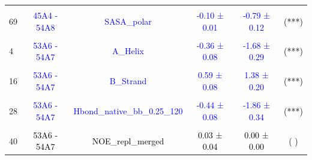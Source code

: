 \documentclass{article}\usepackage[table]{xcolor}
\renewcommand{\$}{$} %
\begin{document}
\begin{center}
\begin{longtable}[t]{lccccc}
\cellcolor{gray!6}{63} & \cellcolor{gray!6}{\textcolor{blue}{45A4 - 54A8}} & \cellcolor{gray!6}{\textcolor{blue}{SASA\_nonpolar}} & \cellcolor{gray!6}{\textcolor{blue}{-0.07 ± 0.01}} & \cellcolor{gray!6}{\textcolor{blue}{-0.50 ± 0.09}} & \cellcolor{gray!6}{\textcolor{black}{(***)}}\\
69 & \textcolor{blue}{45A4 - 54A8} & \textcolor{blue}{SASA\_polar} & \textcolor{blue}{-0.10 ± 0.01} & \textcolor{blue}{-0.79 ± 0.12} & \textcolor{black}{(***)}\\
\cellcolor{gray!6}{75} & \cellcolor{gray!6}{\textcolor{black}{45A4 - 54A8}} & \cellcolor{gray!6}{\textcolor{black}{ThreeTen\_Helix}} & \cellcolor{gray!6}{\textcolor{black}{-0.10 ± 0.08}} & \cellcolor{gray!6}{\textcolor{black}{-0.17 ± 0.11}} & \cellcolor{gray!6}{\textcolor{black}{( )}}\\
4 & \textcolor{blue}{53A6 - 54A7} & \textcolor{blue}{A\_Helix} & \textcolor{blue}{-0.36 ± 0.08} & \textcolor{blue}{-1.68 ± 0.29} & \textcolor{black}{(***)}\\
\cellcolor{gray!6}{10} & \cellcolor{gray!6}{\textcolor{black}{53A6 - 54A7}} & \cellcolor{gray!6}{\textcolor{black}{B\_Bridge}} & \cellcolor{gray!6}{\textcolor{black}{0.07 ± 0.06}} & \cellcolor{gray!6}{\textcolor{black}{0.01 ± 0.08}} & \cellcolor{gray!6}{\textcolor{black}{( )}}\\
16 & \textcolor{blue}{53A6 - 54A7} & \textcolor{blue}{B\_Strand} & \textcolor{blue}{0.59 ± 0.08} & \textcolor{blue}{1.38 ± 0.20} & \textcolor{black}{(***)}\\
\cellcolor{gray!6}{22} & \cellcolor{gray!6}{\textcolor{blue}{53A6 - 54A7}} & \cellcolor{gray!6}{\textcolor{blue}{Hbond\_bb\_0.25\_120}} & \cellcolor{gray!6}{\textcolor{blue}{-0.53 ± 0.06}} & \cellcolor{gray!6}{\textcolor{blue}{-2.58 ± 0.28}} & \cellcolor{gray!6}{\textcolor{black}{(***)}}\\
28 & \textcolor{blue}{53A6 - 54A7} & \textcolor{blue}{Hbond\_native\_bb\_0.25\_120} & \textcolor{blue}{-0.44 ± 0.08} & \textcolor{blue}{-1.86 ± 0.34} & \textcolor{black}{(***)}\\
\cellcolor{gray!6}{34} & \cellcolor{gray!6}{\textcolor{black}{53A6 - 54A7}} & \cellcolor{gray!6}{\textcolor{black}{Jvalue}} & \cellcolor{gray!6}{\textcolor{black}{0.09 ± 0.09}} & \cellcolor{gray!6}{\textcolor{black}{0.06 ± 0.07}} & \cellcolor{gray!6}{\textcolor{black}{( )}}\\
40 & \textcolor{black}{53A6 - 54A7} & \textcolor{black}{NOE\_repl\_merged} & \textcolor{black}{0.03 ± 0.04} & \textcolor{black}{0.00 ± 0.00} & \textcolor{black}{( )}\\

\end{longtable}
\end{center}
\end{document}
